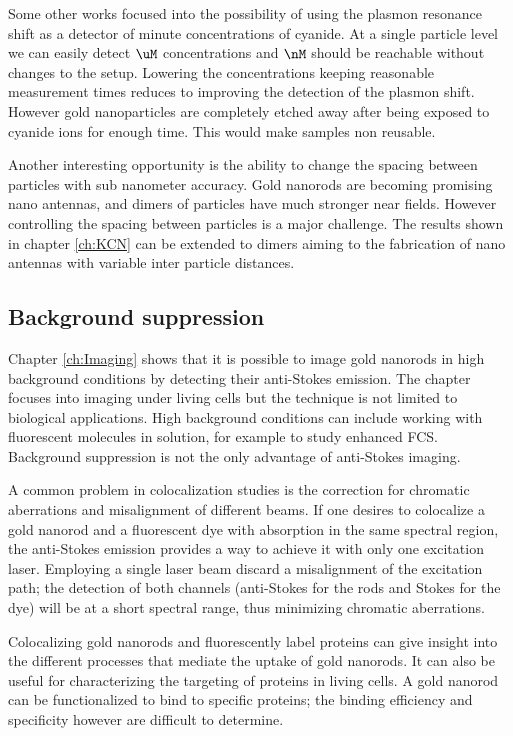 Some other works focused into the possibility of using the plasmon resonance
shift as a detector of minute concentrations of cyanide. At a single particle
level we can easily detect $\uM$ concentrations and $\nM$ should be reachable
without changes to the setup. Lowering the concentrations keeping reasonable
measurement times reduces to improving the detection of the plasmon shift.
However gold nanoparticles are completely etched away after being exposed to
cyanide ions for enough time. This would make samples non reusable.

Another interesting opportunity is the ability to change the spacing between
particles with sub nanometer accuracy. Gold nanorods are becoming promising nano
antennas, and dimers of particles have much stronger near fields. However
controlling the spacing between particles is a major challenge. The results
shown in chapter \ref{ch:KCN} can be extended to dimers aiming to the
fabrication of nano antennas with variable inter particle distances.

\subsection{Background suppression}
Chapter \ref{ch:Imaging} shows that it is possible to image gold nanorods in
high background conditions by detecting their anti-Stokes emission. The chapter
focuses into imaging under living cells but the technique is not limited to
biological applications. High background conditions can include working with
fluorescent molecules in solution, for example to study enhanced FCS. Background
suppression is not the only advantage of anti-Stokes imaging.

A common problem in colocalization studies is the correction for chromatic
aberrations and misalignment of different beams. If one desires to colocalize a
gold nanorod and a fluorescent dye with absorption in the same spectral region,
the anti-Stokes emission provides a way to achieve it with only one excitation
laser. Employing a single laser beam discard a misalignment of the excitation
path; the detection of both channels (anti-Stokes for the rods and Stokes for
the dye) will be at a short spectral range, thus minimizing chromatic
aberrations.

Colocalizing gold nanorods and fluorescently label proteins can give insight
into the different processes that mediate the uptake of gold nanorods. It can
also be useful for characterizing the targeting of proteins in living cells. A
gold nanorod can be functionalized to bind to specific proteins; the binding
efficiency and specificity however are difficult to determine.

